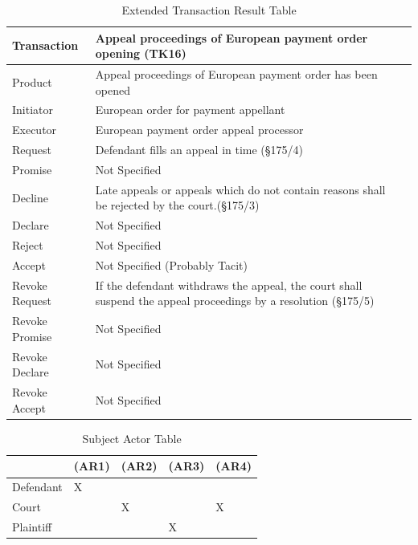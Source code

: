 \begin{landscape}
\begin{table}[h]
\caption{Extended Transaction Result Table}
\label{tab:etrt}
\begin{tabular}{|l||l|l|}
\hline
Transaction  &   Appeal proceedings of European payment order opening (TK16) \\ \hline
Product      &  Appeal proceedings of European payment order has been opened \\ \hline
Initiator      &  European order for payment appellant\\ \hline
Executor       &  European payment order appeal processor \\ \hline
Request        &   Defendant fills an appeal in time (\S175/4) \\ \hline
Promise        &    Not Specified   \\ \hline
Decline        &  Late appeals or appeals which do not contain reasons shall be rejected by the court.(\S175/3)  \\ \hline
Declare        &  Not Specified  \\ \hline
Reject         &  Not Specified   \\ \hline
Accept         & Not Specified (Probably Tacit) \\ \hline
Revoke Request & If the defendant withdraws the appeal, the court shall suspend the appeal proceedings by a resolution (\S175/5)      \\ \hline
Revoke Promise & Not Specified  \\ \hline
Revoke Declare & Not Specified      \\ \hline
Revoke Accept  &  Not Specified \\ \hline
\end{tabular}
\end{table}


\begin{table}[h]
\caption{Subject Actor Table}
\label{tab:subjectactortable}
\begin{tabular}{|l|l|l|l|l|}
\hline
  & (AR1)  &  (AR2)  &  (AR3) & (AR4)  \\ \hline
Defendant & X  &  &  &  \\ \hline
Court &  & X &  & X \\ \hline
Plaintiff &  &  & X & \\ \hline


\end{tabular}
\end{table}

\end{landscape}

